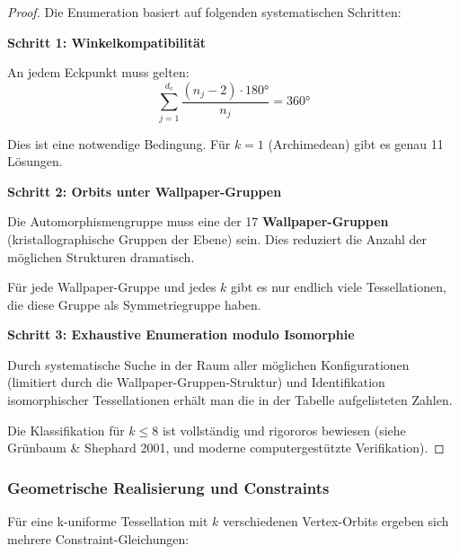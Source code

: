 \documentclass[a4paper,12pt]{article}
\theoremstyle{definition}
\begin{document}
\begin{proof}
	Die Enumeration basiert auf folgenden systematischen Schritten:
	
	\textbf{Schritt 1: Winkelkompatibilität}
	
	An jedem Eckpunkt muss gelten:
	\[
	\sum_{j=1}^{d_v} \frac{(n_j - 2) \cdot 180°}{n_j} = 360°
	\]
	
	Dies ist eine notwendige Bedingung. Für $k=1$ (Archimedean) gibt es genau 11 Lösungen.
	
	\textbf{Schritt 2: Orbits unter Wallpaper-Gruppen}
	
	Die Automorphismengruppe muss eine der 17 \textbf{Wallpaper-Gruppen} (kristallographische Gruppen der Ebene) sein. Dies reduziert die Anzahl der möglichen Strukturen dramatisch.
	
	Für jede Wallpaper-Gruppe und jedes $k$ gibt es nur endlich viele Tessellationen, die diese Gruppe als Symmetriegruppe haben.
	
	\textbf{Schritt 3: Exhaustive Enumeration modulo Isomorphie}
	
	Durch systematische Suche in der Raum aller möglichen Konfigurationen (limitiert durch die Wallpaper-Gruppen-Struktur) und Identifikation isomorphischer Tessellationen erhält man die in der Tabelle aufgelisteten Zahlen.
	
	Die Klassifikation für $k \leq 8$ ist vollständig und rigororos bewiesen (siehe Grünbaum \& Shephard 2001, und moderne computergestützte Verifikation).
\end{proof}

\subsubsection{Geometrische Realisierung und Constraints}

Für eine k-uniforme Tessellation mit $k$ verschiedenen Vertex-Orbits ergeben sich mehrere Constraint-Gleichungen:
\end{document}
